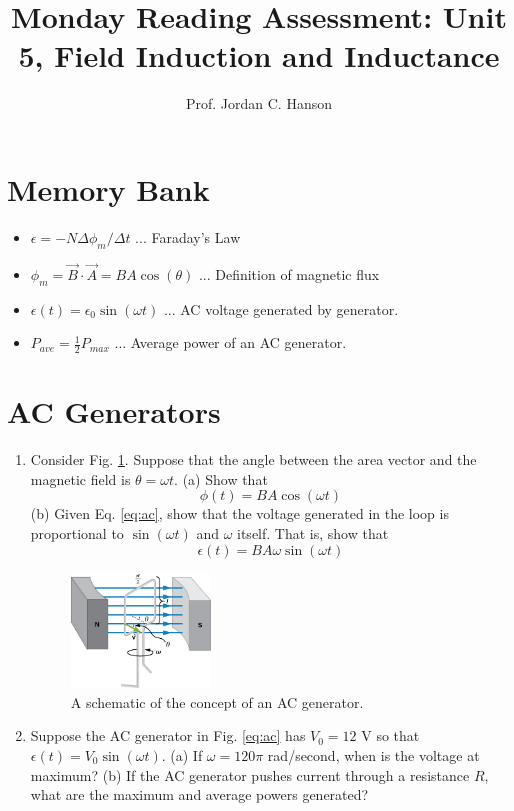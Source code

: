 \documentclass{article}
\begin{document}
\title{Monday Reading Assessment: Unit 5, Field Induction and Inductance}
\author{Prof. Jordan C. Hanson}

\maketitle

\section{Memory Bank}

\begin{itemize}
\item $\epsilon = -N \Delta \phi_m /\Delta t$ ... Faraday's Law
\item $\phi_m = \vec{B} \cdot \vec{A} = BA \cos(\theta)$ ... Definition of magnetic flux
\item $\epsilon(t) = \epsilon_0 \sin(\omega t)$ ... AC voltage generated by generator.
\item $P_{ave} = \frac{1}{2} P_{max}$ ... Average power of an AC generator.
\end{itemize}

\section{AC Generators}

\begin{enumerate}
\item Consider Fig. \ref{fig:acgen}.  Suppose that the angle between the area vector and the magnetic field is $\theta = \omega t$.  (a) Show that
\begin{equation}
\phi(t) = BA\cos(\omega t) \label{eq:ac}
\end{equation}
(b) Given Eq. \ref{eq:ac}, show that the voltage generated in the loop is proportional to $\sin(\omega t)$ and $\omega$ itself.  That is, show that
\begin{equation}
\epsilon(t) = BA\omega \sin(\omega t)
\end{equation}
\begin{figure}[hb]
\centering
\includegraphics[width=0.35\textwidth]{acGen.jpeg}
\caption{\label{fig:acgen} A schematic of the concept of an AC generator.}
\end{figure}
\item Suppose the AC generator in Fig. \ref{eq:ac} has $V_0 = 12$ V so that $\epsilon(t) = V_0 \sin(\omega t)$.  (a) If $\omega = 120\pi$ rad/second, when is the voltage at maximum? (b) If the AC generator pushes current through a resistance $R$, what are the maximum and average powers generated?
\end{enumerate}
\end{document}
